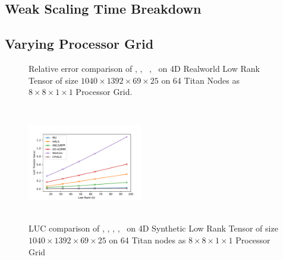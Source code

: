 \subsection{Weak Scaling Time Breakdown}





\subsection{Varying Processor Grid}



\begin{figure}
	\caption{Relative error comparison of \MU, \HALS, \BPP\, \ADMM, \Nestrov\ on 4D Realworld Low Rank Tensor of size $1040\times1392\times69\times25$ on 64 Titan Nodes as $8\times8\times1\times1$ Processor Grid.}
	\label{fig:convergencemouse}
\end{figure}

\begin{figure}
   \includegraphics[width=0.45\textwidth, height=2in]{data/plots/lucmouse64.pdf}
	\caption{LUC comparison of \MU, \HALS, \BPP, \ADMM, \Nestrov\ on 4D Synthetic Low Rank Tensor of size $1040\times1392\times69\times25$ on 64 Titan nodes as $8\times8\times1\times1$ Processor Grid}
	\label{fig:luccompmouse}
\end{figure}


